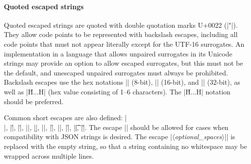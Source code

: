 \documentclass[11pt]{article}
\newcommand{\vmeta}[1]{{\color{DarkRed}\ensuremath{\langle}\textit{#1}\ensuremath{\rangle}}}
\begin{document}
\paragraph{Quoted escaped strings}

Quoted escaped strings are quoted with double quotation marks U+0022 (|"|).  They allow code points to be represented with backslash escapes, including all code points that must not appear literally except for the UTF-16 surrogates.  An implementation in a language that allows unpaired surrogates in its Unicode strings may provide an option to allow escaped surrogates, but this must not be the default, and unescaped unpaired surrogates must always be prohibited.  Backslash escapes use the hex notations |\xHH| (8-bit), |\uHHHH| (16-bit), and |\UHHHHHHHH| (32-bit), as well as |\u{H...H}| (hex value consisting of 1--6 characters).  The |\u{H...H}| notation should be preferred.

Common short escapes are also defined:  |\\|, |\'|, |\"|, |\a|, |\b|, |\e|, |\f|, |\n|, |\r|, |\t|, |\v|.  The escape |\/| should be allowed for cases when compatibility with JSON strings is desired.  The escape |\|\vmeta{optional\_spaces}|\n| is replaced with the empty string, so that a string containing no whitespace may be wrapped across multiple lines.
\end{document}
